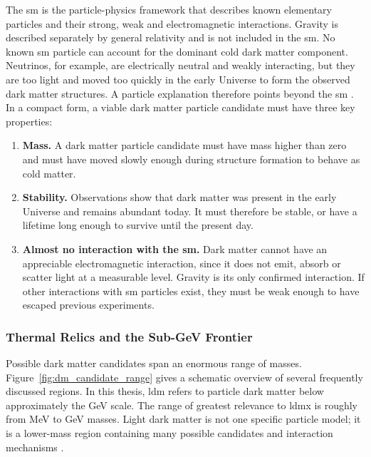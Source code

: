 The \gls{sm} is the particle-physics framework that describes known elementary
particles and their strong, weak and electromagnetic interactions. Gravity is
described separately by general relativity and is not included in the \gls{sm}.
No known \gls{sm} particle can account for the dominant cold dark matter
component. Neutrinos, for example, are electrically neutral and weakly
interacting, but they are too light and moved too quickly in the early Universe
to form the observed dark matter structures. A particle explanation therefore
points beyond the \gls{sm} \cite{cirelli2026-darkmatter}. In a compact form, a
viable dark matter particle candidate must have three key properties:

\begin{enumerate}
    \item \textbf{Mass.} A dark matter particle candidate must have mass higher
    than zero and must have moved slowly enough during structure formation to
    behave as cold matter.
    \item \textbf{Stability.} Observations show that dark matter was present in
    the early Universe and remains abundant today. It must therefore be stable,
    or have a lifetime long enough to survive until the present day.
    \item \textbf{Almost no interaction with the \gls{sm}.} Dark matter cannot
    have an appreciable electromagnetic interaction, since it does not emit,
    absorb or scatter light at a measurable level. Gravity is its only confirmed
    interaction. If other interactions with \gls{sm} particles exist, they must
    be weak enough to have escaped previous experiments.
\end{enumerate}

\subsubsection{Thermal Relics and the Sub-GeV Frontier}
\label{sec:thermal_relic}

Possible dark matter candidates span an enormous range of masses.
Figure~\ref{fig:dm_candidate_range} gives a schematic overview of several
frequently discussed regions. In this thesis, \gls{ldm} refers to particle dark
matter below approximately the GeV scale. The range of greatest relevance to
\gls{ldmx} is roughly from MeV to GeV masses. Light dark matter is not one
specific particle model; it is a lower-mass region containing many possible
candidates and interaction mechanisms
\cite{battaglieri2017-cosmic-visions,ldmx2025-overview}.

